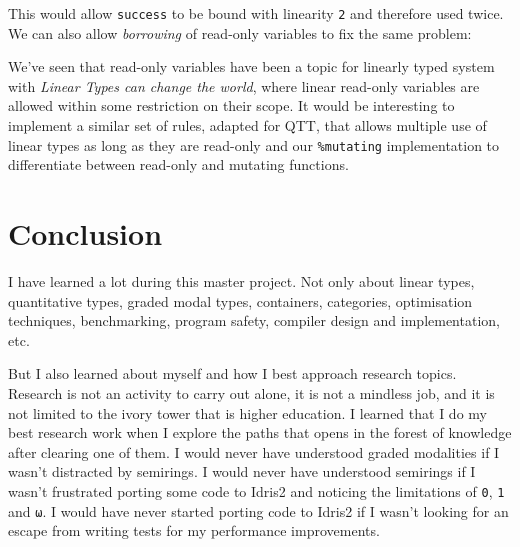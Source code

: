 \documentclass[
]{article}
\newenvironment{Shaded}{}{}
\newcommand{\CommentTok}[1]{\textcolor[rgb]{0.38,0.63,0.69}{\textit{#1}}}
\newcommand{\DataTypeTok}[1]{\textcolor[rgb]{0.56,0.13,0.00}{#1}}
\newcommand{\FunctionTok}[1]{\textcolor[rgb]{0.02,0.16,0.49}{#1}}
\newcommand{\KeywordTok}[1]{\textcolor[rgb]{0.00,0.44,0.13}{\textbf{#1}}}
\newcommand{\NormalTok}[1]{#1}
\newcommand{\OperatorTok}[1]{\textcolor[rgb]{0.40,0.40,0.40}{#1}}
\newcommand{\OtherTok}[1]{\textcolor[rgb]{0.00,0.44,0.13}{#1}}
\newcommand{\StringTok}[1]{\textcolor[rgb]{0.25,0.44,0.63}{#1}}
\begin{document}
This would allow \texttt{success} to be bound with linearity \texttt{2}
and therefore used twice. We can also allow \emph{borrowing} of
read-only variables to fix the same problem:

\begin{Shaded}
\end{Shaded}

We've seen that read-only variables have been a topic for linearly typed
system with \emph{Linear Types can change the
world}\cite{linear_types_update}, where linear read-only variables are
allowed within some restriction on their scope. It would be interesting
to implement a similar set of rules, adapted for QTT, that allows
multiple use of linear types as long as they are read-only and our
\texttt{\%mutating} implementation to differentiate between read-only
and mutating functions.

\newpage

\hypertarget{conclusion}{%
\section{Conclusion}\label{conclusion}}

I have learned a lot during this master project. Not only about linear
types, quantitative types, graded modal types, containers, categories,
optimisation techniques, benchmarking, program safety, compiler design
and implementation, etc.

But I also learned about myself and how I best approach research topics.
Research is not an activity to carry out alone, it is not a mindless
job, and it is not limited to the ivory tower that is higher education.
I learned that I do my best research work when I explore the paths that
opens in the forest of knowledge after clearing one of them. I would
never have understood graded modalities if I wasn't distracted by
semirings. I would never have understood semirings if I wasn't
frustrated porting some code to Idris2 and noticing the limitations of
\texttt{0}, \texttt{1} and \texttt{ω}. I would have never started
porting code to Idris2 if I wasn't looking for an escape from writing
tests for my performance improvements.
\end{document}
